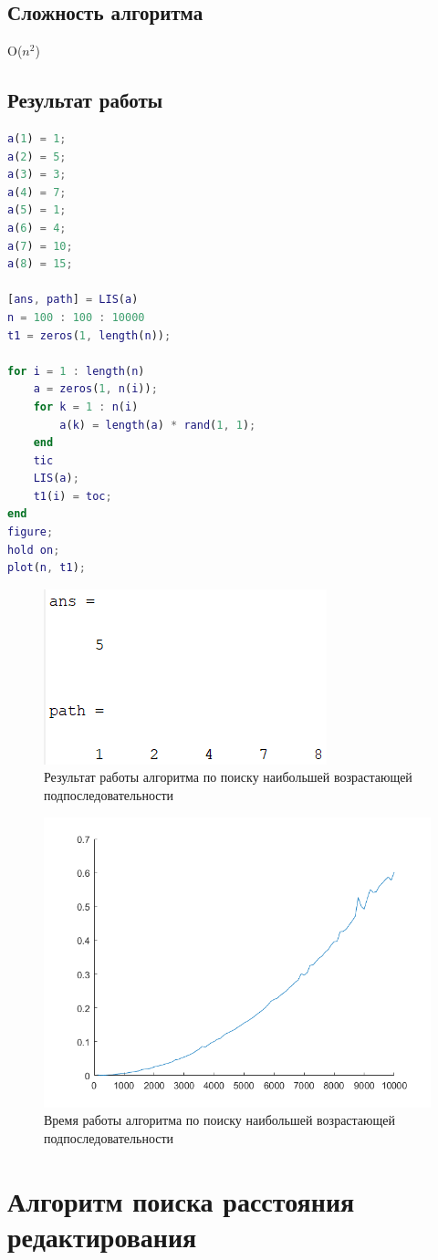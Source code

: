 \documentclass{article}
\begin{document}
\subsection{Сложность алгоритма}
O($n^{2}$)
\subsection{Результат работы}
\begin{lstlisting}[language={Matlab}, caption={Тест. Наибольшая возрастающая подпоследовательность}, label={Script}]
a(1) = 1;
a(2) = 5;
a(3) = 3;
a(4) = 7;
a(5) = 1;
a(6) = 4;
a(7) = 10;
a(8) = 15;

[ans, path] = LIS(a)
n = 100 : 100 : 10000
t1 = zeros(1, length(n));

for i = 1 : length(n)
	a = zeros(1, n(i));
	for k = 1 : n(i)
		a(k) = length(a) * rand(1, 1);
	end
	tic
	LIS(a);
	t1(i) = toc;
end
figure;
hold on;
plot(n, t1);
\end{lstlisting}
\begin{figure}[h]
	\centering
	\includegraphics[width=0.3\linewidth]{LIS.png}
	\caption{Результат работы алгоритма по поиску наибольшей возрастающей подпоследовательности}
\end{figure}
\begin{figure}[h]
	\centering
	\includegraphics[width=0.6\linewidth]{LIS2.png}
	\caption{Время работы алгоритма по поиску наибольшей возрастающей подпоследовательности}
\end{figure}
\section{Алгоритм поиска расстояния редактирования}
\end{document}

